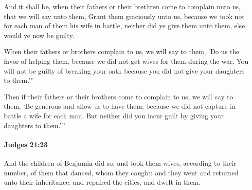 			\begin{versebox}
					\item[BHS] 
					\item[ASV] And it shall be, when their fathers or their brethren come to complain unto us, that we will say unto them, Grant them graciously unto us, because we took not for each man of them his wife in battle, neither did ye give them unto them, else would ye now be guilty.
					\item[NIV] When their fathers or brothers complain to us, we will say to them, ‘Do us the favor of helping them, because we did not get wives for them during the war. You will not be guilty of breaking your oath because you did not give your daughters to them.’”
					\item[NRSV] Then if their fathers or their brothers come to complain to us, we will say to them, ‘Be generous and allow us to have them; because we did not capture in battle a wife for each man. But neither did you incur guilt by giving your daughters to them.’”
			\end{versebox}

		\paragraph{Judges 21:23} %
			\label{JUDGES-21-23}

			And the children of Benjamin did so, and took them wives, according to their number, of them that danced, whom they caught: and they went and returned unto their inheritance, and repaired the cities, and dwelt in them.

